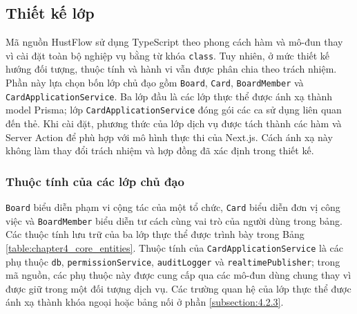 \documentclass[../DoAn.tex]{subfiles}
\begin{document}
\subsection{Thiết kế lớp}
\label{subsection:4.2.2}

Mã nguồn HustFlow sử dụng TypeScript theo phong cách hàm và mô-đun thay vì cài đặt toàn bộ nghiệp vụ bằng từ khóa \texttt{class}. Tuy nhiên, ở mức thiết kế hướng đối tượng, thuộc tính và hành vi vẫn được phân chia theo trách nhiệm. Phần này lựa chọn bốn lớp chủ đạo gồm \texttt{Board}, \texttt{Card}, \texttt{BoardMember} và \texttt{CardApplicationService}. Ba lớp đầu là các lớp thực thể được ánh xạ thành model Prisma; lớp \texttt{CardApplicationService} đóng gói các ca sử dụng liên quan đến thẻ. Khi cài đặt, phương thức của lớp dịch vụ được tách thành các hàm và Server Action để phù hợp với mô hình thực thi của Next.js. Cách ánh xạ này không làm thay đổi trách nhiệm và hợp đồng đã xác định trong thiết kế.

\subsubsection{Thuộc tính của các lớp chủ đạo}
\label{subsubsection:4.2.2.a}

\texttt{Board} biểu diễn phạm vi cộng tác của một tổ chức, \texttt{Card} biểu diễn đơn vị công việc và \texttt{BoardMember} biểu diễn tư cách cùng vai trò của người dùng trong bảng. Các thuộc tính lưu trữ của ba lớp thực thể được trình bày trong Bảng \ref{table:chapter4_core_entities}. Thuộc tính của \texttt{CardApplicationService} là các phụ thuộc \texttt{db}, \texttt{permissionService}, \texttt{auditLogger} và \texttt{realtimePublisher}; trong mã nguồn, các phụ thuộc này được cung cấp qua các mô-đun dùng chung thay vì được giữ trong một đối tượng dịch vụ. Các trường quan hệ của lớp thực thể được ánh xạ thành khóa ngoại hoặc bảng nối ở phần \ref{subsection:4.2.3}.
\end{document}
